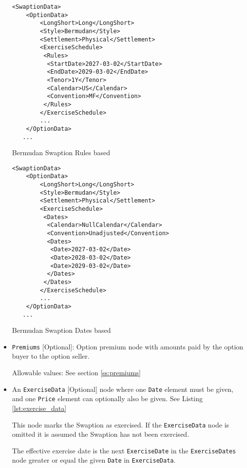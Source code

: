 \begin{itemize}
\begin{listing}[H]
\begin{verbatim}
<SwaptionData>
    <OptionData>
        <LongShort>Long</LongShort>
        <Style>Bermudan</Style>
        <Settlement>Physical</Settlement>
        <ExerciseSchedule>
         <Rules>
          <StartDate>2027-03-02</StartDate>
          <EndDate>2029-03-02</EndDate>
          <Tenor>1Y</Tenor>
          <Calendar>US</Calendar>
          <Convention>MF</Convention>
         </Rules>                    
        </ExerciseSchedule>
        ...
    </OptionData>
   ...
\end{verbatim}
\caption{Bermudan Swaption Rules based}
\label{lst:bermudan_swaption_rules}
\end{listing}

\begin{listing}[H]
\begin{verbatim}
<SwaptionData>
    <OptionData>
        <LongShort>Long</LongShort>
        <Style>Bermudan</Style>
        <Settlement>Physical</Settlement>
        <ExerciseSchedule>
         <Dates>
          <Calendar>NullCalendar</Calendar>
          <Convention>Unadjusted</Convention>
          <Dates>
           <Date>2027-03-02</Date>
           <Date>2028-03-02</Date>
           <Date>2029-03-02</Date>
          </Dates>
         </Dates>                    
        </ExerciseSchedule>
        ...
    </OptionData>
   ...
\end{verbatim}
\caption{Bermudan Swaption Dates based}
\label{lst:bermudan_swaption_dates}
\end{listing}


\item \lstinline!Premiums! [Optional]: Option premium node with amounts paid by the option buyer to the option seller.

Allowable values:  See section \ref{ss:premiums}

\item An \lstinline!ExerciseData! [Optional] node where one  \lstinline!Date! element must be given, and one \lstinline!Price! element can optionally also be given.  See Listing \ref{lst:exercise_data}

This node marks the Swaption as exercised. If the \lstinline!ExerciseData! node is omitted it is assumed the Swaption has not been exercised. 

The effective exercise date is the next \lstinline!ExerciseDate! in the \lstinline!ExerciseDates! node
  greater or equal the given \lstinline!Date!  in \lstinline!ExerciseData!. 
  

\end{itemize}
